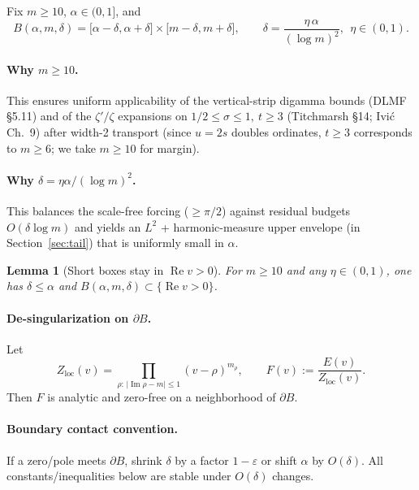 \documentclass[11pt]{article}
\numberwithin{equation}{section}
\newtheorem{lemma}[theorem]{Lemma}
\theoremstyle{remark}
\DeclareMathOperator{\Imag}{Im}
\DeclareMathOperator{\Real}{Re}
\newcommand{\Zloc}{Z_{\mathrm{loc}}}
\begin{document}
Fix $m\ge 10$, $\alpha\in(0,1]$, and
\begin{equation}\label{eq:box-delta}
B(\alpha,m,\delta)=\big[\alpha-\delta,\alpha+\delta\big]\times\big[m-\delta,m+\delta\big],
\qquad
\delta=\frac{\eta\,\alpha}{(\log m)^2},\ \ \eta\in(0,1).
\end{equation}

\paragraph{Why $m\ge 10$.}
This ensures uniform applicability of the vertical-strip digamma bounds (DLMF §5.11) and of the $\zeta'/\zeta$ expansions on $1/2\le\sigma\le1,\ t\ge 3$ (Titchmarsh §14; Ivi\'c Ch.~9) after width-2 transport (since $u=2s$ doubles ordinates, $t\ge3$ corresponds to $m\ge 6$; we take $m\ge10$ for margin).

\paragraph{Why $\delta=\eta\alpha/(\log m)^2$.}
This balances the scale-free forcing ($\ge\pi/2$) against residual budgets $O(\delta\log m)$ and yields an $L^2$ + harmonic-measure upper envelope (in Section~\ref{sec:tail}) that is uniformly small in $\alpha$.

\begin{lemma}[Short boxes stay in $\Real v>0$]\label{lem:box-right}
For $m\ge10$ and any $\eta\in(0,1)$, one has $\delta\le \alpha$ and $B(\alpha,m,\delta)\subset\{\Real v>0\}$.
\end{lemma}

\paragraph{De-singularization on $\partial B$.}
Let
\begin{equation}\label{eq:Zloc}
\Zloc(v)=\prod_{\rho:\,|\Imag\rho-m|\le 1}(v-\rho)^{m_\rho},\qquad
F(v):=\frac{E(v)}{\Zloc(v)}.
\end{equation}
Then $F$ is analytic and zero-free on a neighborhood of $\partial B$.

\paragraph{Boundary contact convention.}
If a zero/pole meets $\partial B$, shrink $\delta$ by a factor $1-\varepsilon$ or shift $\alpha$ by $O(\delta)$. All constants/inequalities below are stable under $O(\delta)$ changes.
\end{document}
